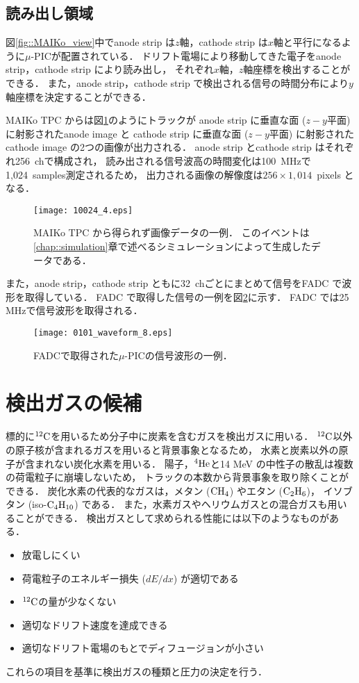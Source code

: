 \documentclass[../master]{subfiles}
\begin{document}
\subsection{読み出し領域}
\label{sec::mu-pic}
図\ref{fig::MAIKo_view}中でanode strip は$z$軸，cathode strip は$x$軸と平行になるように$\mu$-PICが配置されている．
ドリフト電場により移動してきた電子をanode strip，cathode strip により読み出し，
それぞれ$x$軸，$z$軸座標を検出することができる．
また，anode strip，cathode strip で検出される信号の時間分布により$y$軸座標を決定することができる．

MAIKo TPC からは図\ref{fig::track_demo}のようにトラックが
anode strip に垂直な面 ($z-y$平面) に射影されたanode image と
cathode strip に垂直な面 ($z-y$平面) に射影されたcathode image の2つの画像が出力される．
anode strip とcathode strip はそれぞれ256~chで構成され，
読み出される信号波高の時間変化は100~MHzで1,024~samples測定されるため，
出力される画像の解像度は$256\times1,014$~pixels となる．
\begin{figure}
  \centering
  \texttt{[image: 10024\_4.eps]}
  \caption[MAIKo TPC から得られず画像データの一例．]
          {MAIKo TPC から得られず画像データの一例．
          このイベントは\ref{chap::simulation}章で述べるシミュレーションによって生成したデータである．}
  \label{fig::track_demo}
\end{figure}
また，anode strip，cathode strip ともに32~chごとにまとめて信号をFADC で波形を取得している．
FADC で取得した信号の一例を図\ref{fig::FADC_waveform}に示す．
FADC では25 MHzで信号波形を取得される．
\begin{figure}
  \centering
  \texttt{[image: 0101\_waveform\_8.eps]}
  \caption{FADCで取得された$\mu$-PICの信号波形の一例．}
  \label{fig::FADC_waveform}
\end{figure}

\section{検出ガスの候補}
\label{sec::detection_gas_candidate}
標的に${}^{12}{\rm C}$を用いるため分子中に炭素を含むガスを検出ガスに用いる．
${}^{12}{\rm C}$以外の原子核が含まれるガスを用いると背景事象となるため，
水素と炭素以外の原子が含まれない炭化水素を用いる．
陽子，${}^{4}{\rm He}$と14 MeV の中性子の散乱は複数の荷電粒子に崩壊しないため，
トラックの本数から背景事象を取り除くことができる．
炭化水素の代表的なガスは，メタン (${\rm CH_{4}}$) やエタン (${\rm C_{2}H_{6}}$)，
イソブタン (iso-${\rm C_{4}H_{10}}$) である．
また，水素ガスやヘリウムガスとの混合ガスも用いることができる．
検出ガスとして求められる性能には以下のようなものがある．
\begin{itemize}
\item
  放電しにくい
\item
  荷電粒子のエネルギー損失 ($dE/dx$) が適切である
\item
  ${}^{12}{\rm C}$の量が少なくない
\item
  適切なドリフト速度を達成できる
\item
  適切なドリフト電場のもとでディフュージョンが小さい
\end{itemize}
これらの項目を基準に検出ガスの種類と圧力の決定を行う．
\end{document}
